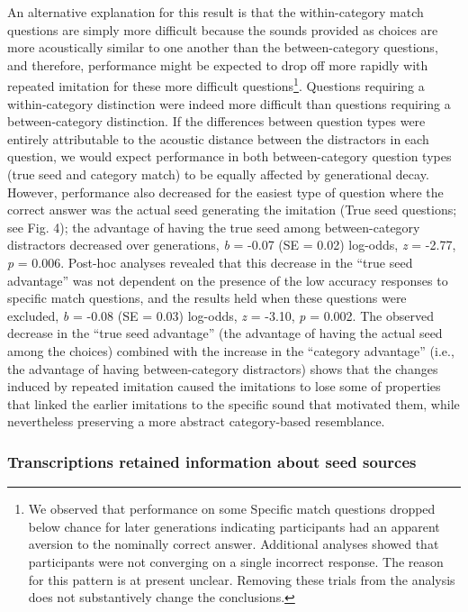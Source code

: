 \documentclass[english,floatsintext,man]{apa6}
\theoremstyle{definition}
\theoremstyle{definition}
\theoremstyle{definition}
\theoremstyle{remark}
\begin{document}
An alternative explanation for this result is that the within-category
match questions are simply more difficult because the sounds provided as
choices are more acoustically similar to one another than the
between-category questions, and therefore, performance might be expected
to drop off more rapidly with repeated imitation for these more
difficult questions\footnote{We observed that performance on some
  Specific match questions dropped below chance for later generations
  indicating participants had an apparent aversion to the nominally
  correct answer. Additional analyses showed that participants were not
  converging on a single incorrect response. The reason for this pattern
  is at present unclear. Removing these trials from the analysis does
  not substantively change the conclusions.}. Questions requiring a
within-category distinction were indeed more difficult than questions
requiring a between-category distinction. If the differences between
question types were entirely attributable to the acoustic distance
between the distractors in each question, we would expect performance in
both between-category question types (true seed and category match) to
be equally affected by generational decay. However, performance also
decreased for the easiest type of question where the correct answer was
the actual seed generating the imitation (True seed questions; see Fig.
4); the advantage of having the true seed among between-category
distractors decreased over generations, \emph{b} = -0.07 (SE = 0.02)
log-odds, \emph{z} = -2.77, \emph{p} = 0.006. Post-hoc analyses revealed
that this decrease in the \enquote{true seed advantage} was not
dependent on the presence of the low accuracy responses to specific
match questions, and the results held when these questions were
excluded, \emph{b} = -0.08 (SE = 0.03) log-odds, \emph{z} = -3.10,
\emph{p} = 0.002. The observed decrease in the \enquote{true seed
advantage} (the advantage of having the actual seed among the choices)
combined with the increase in the \enquote{category advantage} (i.e.,
the advantage of having between-category distractors) shows that the
changes induced by repeated imitation caused the imitations to lose some
of properties that linked the earlier imitations to the specific sound
that motivated them, while nevertheless preserving a more abstract
category-based resemblance.

\hypertarget{transcriptions-retained-information-about-seed-sources}{%
\subsubsection{Transcriptions retained information about seed
sources}\label{transcriptions-retained-information-about-seed-sources}}
\end{document}
